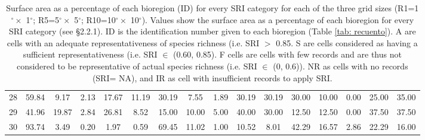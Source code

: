 \documentclass[12pt,authoryear]{elsarticle}
\begin{document}
\begin{table}[]
{\begin{tabular}{|c |c  c  c  c  c | c  c  c  c   c | c  c  c  c  c |}
  28 & 59.84 &  9.17 & 2.13 & 17.67 & 11.19 & 30.19 &  7.55 &  1.89 & 30.19 & 30.19 & 30.00 & 10.00 &  0.00 & 25.00 & 35.00 \\ 
  29 & 41.96 & 19.87 & 2.84 & 26.81 &  8.52 & 15.00 & 10.00 &  5.00 & 40.00 & 30.00 & 12.50 & 12.50 &  0.00 & 37.50 & 37.50 \\ 
  30 & 93.74 &  3.49 & 0.20 &  1.97 &  0.59 & 69.45 & 11.02 &  1.00 & 10.52 &  8.01 & 42.29 & 16.57 &  2.86 & 22.29 & 16.00 \\ 
\hline
   \hline
\end{tabular}
}
\caption{
  Surface area as a percentage of each bioregion (ID) for every SRI category for each of the three grid sizes (R1=1$^\circ \times$ 1$^\circ$; R5=5$^\circ \times$ 5$^\circ$; R10=10$^\circ \times$ 10$^\circ$). Values  show the surface area as a percentage of each bioregion for every SRI category (see \S 2.2.1). ID is the identification number given to each bioregion (Table \ref{tab: recuento}). A are cells with an adequate representativeness of species richness (i.e. SRI $>$ 0.85. S are cells considered as having a sufficient representativeness (i.e. SRI $\in$ (0.60, 0.85). F cells are cells with few records and are thus not considered to be representative of actual species richness (i.e. SRI $\in$ (0, 0.6)). NR as cells with no records (SRI= NA), and IR as cell with insufficient records to apply SRI. \label{tab: percentage} }
\end{table}
\end{document}
